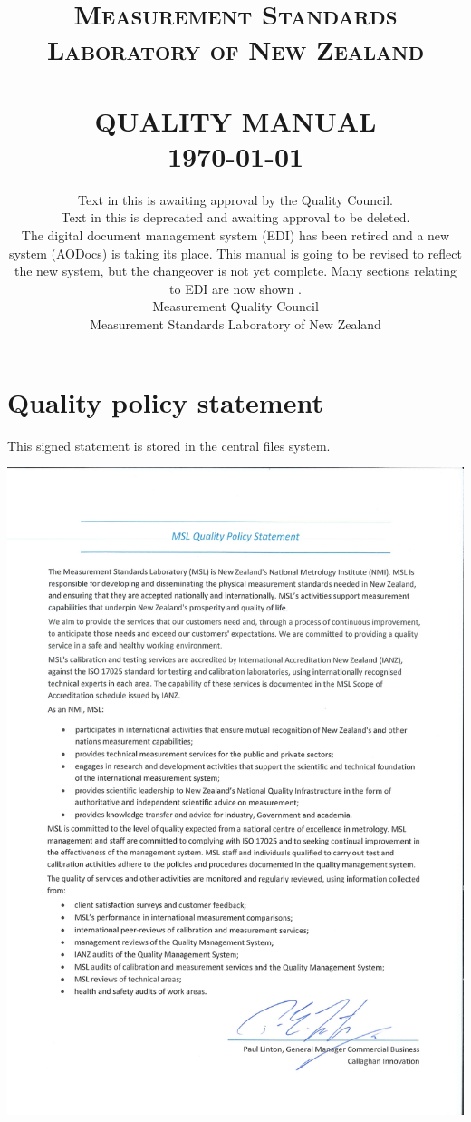 \documentclass[a4paper]{article}
\title{	\Large 
	\textsc{ Measurement Standards Laboratory of New Zealand } \\ [2.0cm]			
	\HRule{2pt} \\ [0.25cm]						
	\LARGE \textbf{\uppercase{Quality Manual}}	%
	\HRule{2pt} \\ [0.25cm]		
	\Large \today			
}
\author{
{\large 
	Text in this \proposed{colour} is awaiting approval by the 
	Quality Council.\\ 
	Text in this \deprecated{colour} is deprecated 
	and awaiting approval to be deleted. \\
	\vspace{\baselineskip}
	The digital document management system (EDI) has been retired and 
	a new system (AODocs) is taking its place. This manual is going to be 
	revised to reflect the new system, but the changeover is not yet complete.
	Many sections relating to EDI are now shown \deprecated{deprecated}.
} 
\\[\baselineskip] 		
Measurement Quality Council\\	
Measurement Standards Laboratory of New Zealand\\	
}
\makeatletter
\def\printtitle{%
    {\centering \@title\par}}
\def\printauthor{%
    {\raggedright \Large \@author}}
\makeatother
\begin{document}
\hypersetup{pageanchor=false}	%
\fancyhf{}	%

\thispagestyle{empty}		%
\pagestyle{plain}			%

\printtitle					%
  	\vfill
\printauthor				%
\newpage


\tableofcontents
\newpage

\section*{Quality policy statement}
\label{ss:quality_policy_statement}
This signed statement is stored in the central files system. 

\begin{center}
\includegraphics[width=1.05\textwidth]{pictures/MSL_qps_(signed)}
\end{center}
\clearpage
\end{document}
